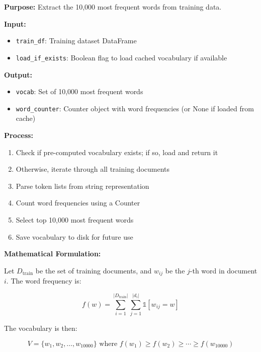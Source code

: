 \documentclass[11pt,a4paper]{article}
\begin{document}
\textbf{Purpose:} Extract the 10,000 most frequent words from training data.

\textbf{Input:}
\begin{itemize}
    \item \texttt{train\_df}: Training dataset DataFrame
    \item \texttt{load\_if\_exists}: Boolean flag to load cached vocabulary if available
\end{itemize}

\textbf{Output:}
\begin{itemize}
    \item \texttt{vocab}: Set of 10,000 most frequent words
    \item \texttt{word\_counter}: Counter object with word frequencies (or None if loaded from cache)
\end{itemize}

\textbf{Process:}
\begin{enumerate}
    \item Check if pre-computed vocabulary exists; if so, load and return it
    \item Otherwise, iterate through all training documents
    \item Parse token lists from string representation
    \item Count word frequencies using a Counter
    \item Select top 10,000 most frequent words
    \item Save vocabulary to disk for future use
\end{enumerate}

\textbf{Mathematical Formulation:}

Let $D_{\text{train}}$ be the set of training documents, and $w_{ij}$ be the $j$-th word in document $i$. The word frequency is:

\begin{equation}
f(w) = \sum_{i=1}^{|D_{\text{train}}|} \sum_{j=1}^{|d_i|} \mathbb{1}[w_{ij} = w]
\end{equation}

The vocabulary is then:

\begin{equation}
V = \{w_1, w_2, \ldots, w_{10000}\} \text{ where } f(w_1) \geq f(w_2) \geq \cdots \geq f(w_{10000})
\end{equation}
\end{document}
